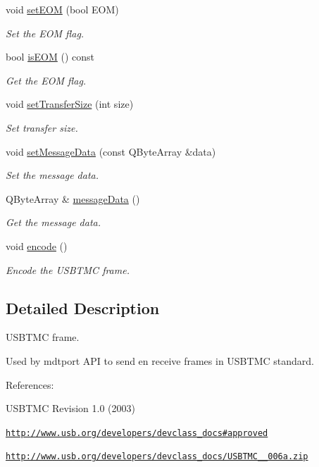 \begin{DoxyCompactItemize}
void \hyperlink{classmdt_frame_usb_tmc_ab6e494c35eba34905987a75101fc48fe}{setEOM} (bool EOM)
\begin{DoxyCompactList}\small\item\em Set the EOM flag. \end{DoxyCompactList}\item 
bool \hyperlink{classmdt_frame_usb_tmc_a82e93db0fc709b951c0c1f7b70692b5c}{isEOM} () const 
\begin{DoxyCompactList}\small\item\em Get the EOM flag. \end{DoxyCompactList}\item 
void \hyperlink{classmdt_frame_usb_tmc_a7ad2f8426ebeceaa6f84925d9a96b5c0}{setTransferSize} (int size)
\begin{DoxyCompactList}\small\item\em Set transfer size. \end{DoxyCompactList}\item 
void \hyperlink{classmdt_frame_usb_tmc_a7fa61faeaa5d1f5820794c5943b26e26}{setMessageData} (const QByteArray \&data)
\begin{DoxyCompactList}\small\item\em Set the message data. \end{DoxyCompactList}\item 
QByteArray \& \hyperlink{classmdt_frame_usb_tmc_a03d9a1c16099ba7ea1e3a2b0c4e1493e}{messageData} ()
\begin{DoxyCompactList}\small\item\em Get the message data. \end{DoxyCompactList}\item 
void \hyperlink{classmdt_frame_usb_tmc_a9406dddfdd70f5dac729b2dbd728de77}{encode} ()
\begin{DoxyCompactList}\small\item\em Encode the USBTMC frame. \end{DoxyCompactList}\end{DoxyCompactItemize}


\subsection{Detailed Description}
USBTMC frame. 

Used by mdtport API to send en receive frames in USBTMC standard.

References:
\begin{DoxyItemize}
\item USBTMC Revision 1.0 (2003)
\item \href{http://www.usb.org/developers/devclass_docs#approved}{\tt http://www.usb.org/developers/devclass\_\-docs\#approved}
\item \href{http://www.usb.org/developers/devclass_docs/USBTMC_1_006a.zip}{\tt http://www.usb.org/developers/devclass\_\-docs/USBTMC\_\_\-006a.zip} 
\end{DoxyItemize}


